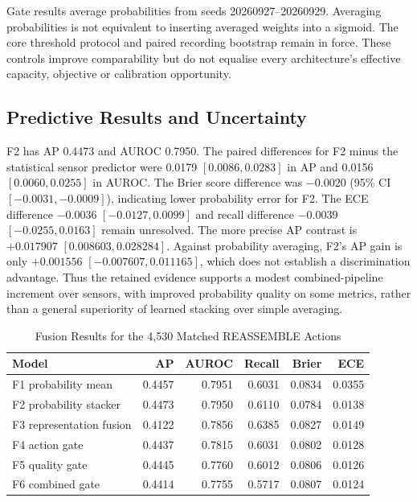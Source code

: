 Gate results average probabilities from seeds 20260927--20260929. Averaging
probabilities is not equivalent to inserting averaged weights into a sigmoid. The core
threshold protocol and paired recording bootstrap remain in force. These controls
improve comparability but do not equalise every architecture's effective capacity,
objective or calibration opportunity.

\subsection{Predictive Results and Uncertainty}
F2 has AP 0.4473 and AUROC 0.7950. The paired differences for F2 minus the statistical
sensor predictor were 0.0179 $[0.0086, 0.0283]$ in AP and 0.0156 $[0.0060, 0.0255]$ in AUROC.
The Brier score difference was $-0.0020$ (95\% CI $[-0.0031, -0.0009]$), indicating lower
probability error for F2. The ECE difference $-0.0036$ $[-0.0127, 0.0099]$ and recall
difference $-0.0039$ $[-0.0255, 0.0163]$ remain unresolved. The more precise AP contrast is
$+0.017907$ $[0.008603, 0.028284]$. Against probability averaging, F2's AP gain is only
$+0.001556$ $[-0.007607, 0.011165]$, which does not establish a discrimination advantage.
Thus the retained evidence supports a modest combined-pipeline increment over sensors,
with improved probability quality on some metrics, rather than a general superiority of
learned stacking over simple averaging.

\begin{table}[htbp]
\caption{Fusion Results for the 4,530 Matched REASSEMBLE Actions}\label{tab:reassemble-fusion}
\centering\small

\begin{tabular}{lrrrrr}\toprule
Model & AP & AUROC & Recall & Brier & ECE\\\midrule
F1 probability mean & 0.4457 & 0.7951 & 0.6031 & 0.0834 & 0.0355\\
F2 probability stacker & 0.4473 & 0.7950 & 0.6110 & 0.0784 & 0.0138\\
F3 representation fusion & 0.4122 & 0.7856 & 0.6385 & 0.0827 & 0.0149\\
F4 action gate & 0.4437 & 0.7815 & 0.6031 & 0.0802 & 0.0128\\
F5 quality gate & 0.4445 & 0.7760 & 0.6012 & 0.0806 & 0.0126\\
F6 combined gate & 0.4414 & 0.7755 & 0.5717 & 0.0807 & 0.0124\\\bottomrule
\end{tabular}
\end{table}


